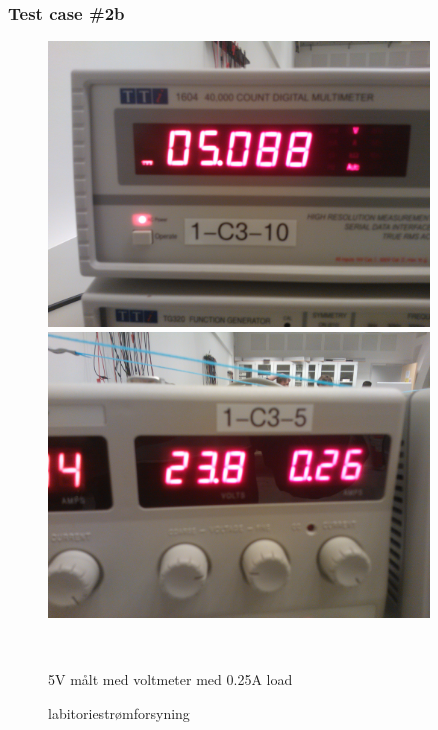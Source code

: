 \subsubsection{Test case \#2b}
\begin{figure}[htbp] \centering
\begin{minipage}[c]{0.48\textwidth} \centering
\includegraphics[width=0.9\textwidth]{billeder/5V_025A_meter.jpg} 
\end{minipage} \hfill
\begin{minipage}[c]{0.48\textwidth} \centering
\includegraphics[width=0.9\textwidth]{billeder/5V_025A_power.jpg} 
\end{minipage} \\ 
\begin{minipage}[b]{0.48\textwidth}
\caption{5V målt med voltmeter med 0.25A load} 
\label{fig:udgang_5V_025A}
\end{minipage} \hfill
\begin{minipage}[b]{0.48\textwidth}
\caption{labitoriestrømforsyning} 
\label{fig:forsyning_5V_025A_lab}
\end{minipage}
\end{figure}
